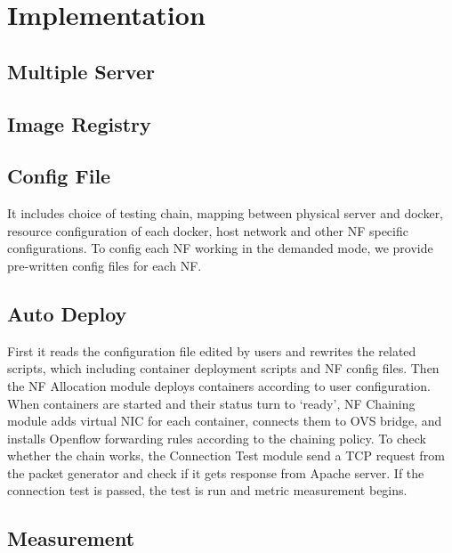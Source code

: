\section{Implementation}
\subsection{Multiple Server}
\subsection{Image Registry}
\subsection{Config File}
It includes choice of testing chain,
mapping between physical server and docker,
resource configuration of each docker,
host network and other NF specific configurations.
To config each NF working in the demanded mode,
we provide pre-written config files for each NF.
\subsection{Auto Deploy}
First it reads the configuration file edited by users and rewrites the related scripts,
which including container deployment scripts and NF config files.
Then the NF Allocation module deploys containers according to user configuration.
When containers are started and their status turn to `ready',
NF Chaining module adds virtual NIC for each container,
connects them to OVS bridge,
and installs Openflow forwarding rules according to the chaining policy.
To check whether the chain works,
the Connection Test module send a TCP request
from the packet generator and check if it gets response from Apache server.
If the connection test is passed,
the test is run and metric measurement begins.
\subsection{Measurement}

